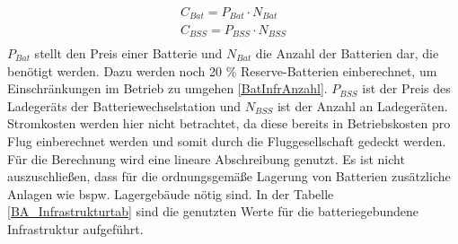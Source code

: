 \begin{equation}
   \begin{split}
  {C_{Bat}} = P_{Bat} \cdot N_{Bat}  \\
  {C_{BSS}} = P_{BSS} \cdot N_{BSS} \\
  \label{BA_zusatz}
   \end{split}
  \end{equation}
%
$P_{Bat}$ stellt den Preis einer Batterie und $N_{Bat}$ die Anzahl der Batterien dar, die benötigt werden. 
Dazu werden noch 20 \% Reserve-Batterien einberechnet, um Einschränkungen im Betrieb zu umgehen \eqref{BatInfrAnzahl}. 
$P_{BSS}$ ist der Preis des Ladegeräts der Batteriewechselstation und $N_{BSS}$ ist der Anzahl an Ladegeräten. 
Stromkosten werden hier nicht betrachtet, da diese bereits in Betriebskosten 
pro Flug einberechnet werden und somit durch die Fluggesellschaft gedeckt werden. 
Für die Berechnung wird eine lineare Abschreibung genutzt. 
Es ist nicht auszuschließen, dass für die ordnungsgemäße Lagerung 
von Batterien zusätzliche Anlagen wie bspw. Lagergebäude nötig sind. %
In der Tabelle \ref{BA_Infrastrukturtab} sind die genutzten Werte für die batteriegebundene Infrastruktur aufgeführt.
%
%
%
